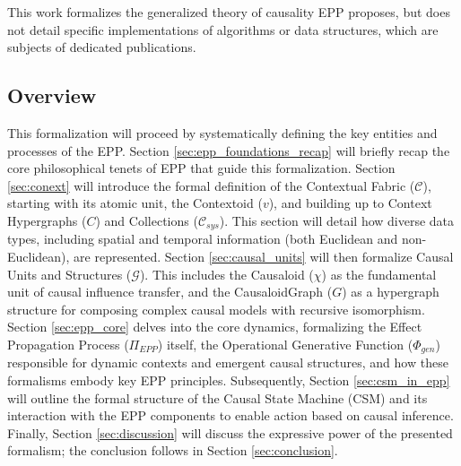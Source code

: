 This work formalizes the generalized theory of causality EPP proposes, but does not detail specific implementations of 
algorithms or data structures, which are subjects of dedicated publications. 

\subsection{Overview}
\label{sec:formal_intro_overview}

   This formalization will proceed by systematically defining the key entities and processes of the EPP.
    Section \ref{sec:epp_foundations_recap} will briefly recap the core philosophical tenets of EPP that guide this formalization.
    Section \ref{sec:conext} will introduce the formal definition of the Contextual Fabric (\(\mathcal{C}\)), starting with its atomic unit, the Contextoid (\(v\)), and building up to Context Hypergraphs (\(C\)) and Collections (\(\mathcal{C}_{sys}\)). This section will detail how diverse data types, including spatial and temporal information (both Euclidean and non-Euclidean), are represented.
    Section \ref{sec:causal_units} will then formalize Causal Units and Structures (\(\mathcal{G}\)). This includes the Causaloid (\(\chi\)) as the fundamental unit of causal influence transfer, and the CausaloidGraph (\(G\)) as a hypergraph structure for composing complex causal models with recursive isomorphism.
    Section \ref{sec:epp_core} delves into the core dynamics, formalizing the Effect Propagation Process (\(\Pi_{EPP}\)) itself, the Operational Generative Function (\(\Phi_{gen}\)) responsible for dynamic contexts and emergent causal structures, and how these formalisms embody key EPP principles.
    Subsequently, Section \ref{sec:csm_in_epp} will outline the formal structure of the Causal State Machine (CSM) and its interaction with the EPP components to enable action based on causal inference.
    Finally, Section \ref{sec:discussion} will discuss the expressive power of the presented formalism; the conclusion follows in Section \ref{sec:conclusion}.
